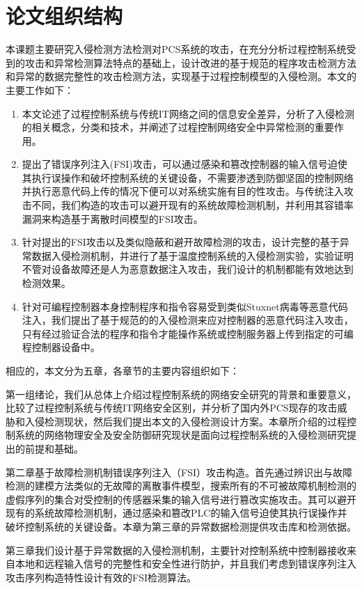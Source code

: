 \section{论文组织结构}

本课题主要研究入侵检测方法检测对PCS系统的攻击，在充分分析过程控制系统受到的攻击和异常检测算法特点的基础上，设计改进的基于规范的程序攻击检测方法和异常的数据完整性的攻击检测方法，实现基于过程控制模型的入侵检测。本文的主要工作如下：
\begin{enumerate}
	\item 本文论述了过程控制系统与传统IT网络之间的信息安全差异，分析了入侵检测的相关概念，分类和技术，并阐述了过程控制网络安全中异常检测的重要作用。
	\item 提出了错误序列注入(FSI)攻击，可以通过感染和篡改控制器的输入信号迫使其执行误操作和破坏控制系统的关键设备，不需要渗透到防御坚固的控制网络并执行恶意代码上传的情况下便可以对系统实施有目的性攻击。与传统注入攻击不同，我们构造的攻击可以避开现有的系统故障检测机制，并利用其容错率漏洞来构造基于离散时间模型的FSI攻击。
	\item 针对提出的FSI攻击以及类似隐蔽和避开故障检测的攻击，设计完整的基于异常数据入侵检测机制，并进行了基于温度控制系统的入侵检测实验，实验证明不管对设备故障还是人为恶意数据注入攻击，我们设计的机制都能有效地达到检测效果。
	\item 针对可编程控制器本身控制程序和指令容易受到类似Stuxnet病毒等恶意代码注入，我们提出了基于规范的的入侵检测来应对控制器的恶意代码注入攻击，只有经过验证合法的程序和指令才能操作系统或控制服务器上传到指定的可编程控制器设备中。
\end{enumerate}

相应的，本文分为五章，各章节的主要内容组织如下：

第一组绪论，我们从总体上介绍过程控制系统的网络安全研究的背景和重要意义，比较了过程控制系统与传统IT网络安全区别，并分析了国内外PCS现存的攻击威胁和入侵检测现状，然后我们提出本文的入侵检测设计方案。本章所介绍的过程控制系统的网络物理安全及安全防御研究现状是面向过程控制系统的入侵检测研究提出的前提和基础。

第二章基于故障检测机制错误序列注入（FSI）攻击构造。首先通过辨识出与故障检测的建模方法类似的无故障的离散事件模型，搜索所有的不可被故障机制检测的虚假序列的集合对受控制的传感器采集的输入信号进行篡改实施攻击。其可以避开现有的系统故障检测机制，通过感染和篡改PLC的输入信号迫使其执行误操作并破坏控制系统的关键设备。本章为第三章的异常数据检测提供攻击库和检测依据。

第三章我们设计基于异常数据的入侵检测机制，主要针对控制系统中控制器接收来自本地和远程输入信号的完整性和安全性进行防护，并且我们考虑到错误序列注入攻击序列构造特性设计有效的FSI检测算法。


